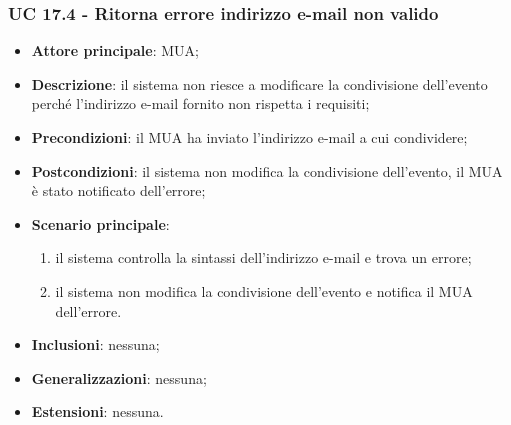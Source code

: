     \subsubsection{UC 17.4 - Ritorna errore indirizzo e-mail non valido} \label{sec:UC17.4}
    \begin{itemize}
        \item \textbf{Attore principale}: MUA;
        \item \textbf{Descrizione}: il sistema non riesce a modificare la condivisione dell'evento perché l'indirizzo e-mail fornito non rispetta i requisiti;
        \item \textbf{Precondizioni}: il MUA ha inviato l'indirizzo e-mail a cui condividere;
        \item \textbf{Postcondizioni}: il sistema non modifica la condivisione dell'evento, il MUA è stato notificato dell'errore;
        \item \textbf{Scenario principale}:
            \begin{enumerate}
                \item il sistema controlla la sintassi dell'indirizzo e-mail e trova un errore;
                \item il sistema non modifica la condivisione dell'evento e notifica il MUA dell'errore.
            \end{enumerate}
        \item \textbf{Inclusioni}: nessuna;
        \item \textbf{Generalizzazioni}: nessuna;
        \item \textbf{Estensioni}: nessuna.
    \end{itemize}
